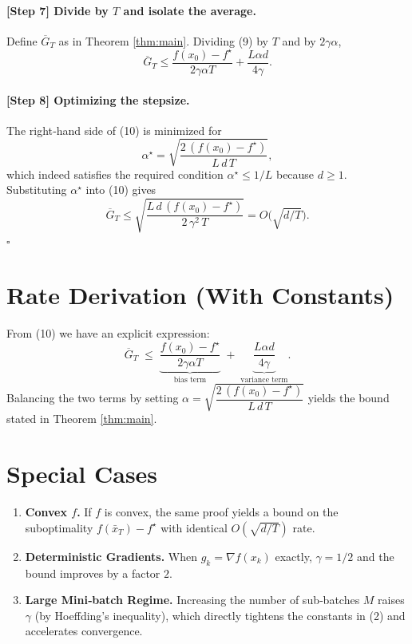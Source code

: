 \documentclass{article}
\begin{document}
\paragraph{[Step 7] Divide by $T$ and isolate the average.}
Define $\overline{G}_{T}$ as in Theorem \ref{thm:main}.  Dividing (9) by $T$ and by $2\gamma\alpha$,
\[
\overline{G}_{T}
\le \frac{f(x_{0})-f^{\star}}{2\gamma\alpha T}
+ \frac{L\alpha d}{4\gamma}. \tag{10}
\]

\paragraph{[Step 8] Optimizing the stepsize.}
The right‑hand side of (10) is minimized for
\[
\alpha^{\star}= \sqrt{\frac{2\,(f(x_{0})-f^{\star})}{L\,d\,T}},
\]
which indeed satisfies the required condition $\alpha^{\star}\le 1/L$ because $d\ge1$.  Substituting $\alpha^{\star}$ into (10) gives
\[
\overline{G}_{T}
\le
\sqrt{\frac{L\,d\,(f(x_{0})-f^{\star})}{2\,\gamma^{2}\,T}}
= O\!\bigl(\sqrt{d/T}\bigr).
\]
\hfill $\square$

\section*{Rate Derivation (With Constants)}
From (10) we have an explicit expression:
\[
\overline{G}_{T}\;\le\;
\underbrace{\frac{f(x_{0})-f^{\star}}{2\gamma\alpha T}}_{\text{bias term}}
\;+\;
\underbrace{\frac{L\alpha d}{4\gamma}}_{\text{variance term}}.
\]
Balancing the two terms by setting $\alpha = \sqrt{ \dfrac{2\,(f(x_{0})-f^{\star})}{L\,d\,T}}$ yields the bound stated in Theorem \ref{thm:main}.

\section*{Special Cases}
\begin{enumerate}
\item \textbf{Convex $f$.} If $f$ is convex, the same proof yields a bound on the suboptimality $f(\bar{x}_{T})-f^{\star}$ with identical $O(\sqrt{d/T})$ rate.
\item \textbf{Deterministic Gradients.} When $g_{k}=\nabla f(x_{k})$ exactly, $\gamma=1/2$ and the bound improves by a factor $2$.
\item \textbf{Large Mini‑batch Regime.} Increasing the number of sub‑batches $M$ raises $\gamma$ (by Hoeffding’s inequality), which directly tightens the constants in (2) and accelerates convergence.
\end{enumerate}
\end{document}
